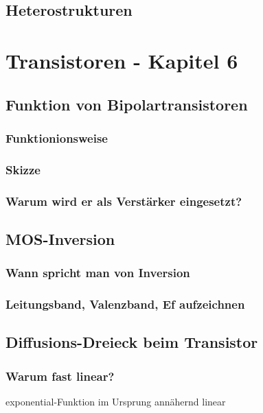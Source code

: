 \documentclass{article}
\begin{document}
\subsection{Heterostrukturen}\label{k5:heterostrukturen}


\section{Transistoren - Kapitel 6}
\subsection{Funktion von Bipolartransistoren}\label{k6:bipolar}
    \subsubsection{Funktionionsweise}
    \subsubsection{Skizze}
    \subsubsection{Warum wird er als Verst\"arker eingesetzt?}
\subsection{MOS-Inversion}\label{k6:mosInversion}

    \subsubsection{Wann spricht man von Inversion}
    \subsubsection{Leitungsband, Valenzband, Ef aufzeichnen}

\subsection{Diffusions-Dreieck beim Transistor}\label{k6:diffusionsdreieck}
    \subsubsection{Warum fast linear?} exponential-Funktion im Ursprung ann\"ahernd linear
\end{document}
